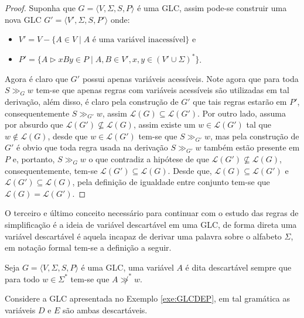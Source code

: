 \begin{proof}
    Suponha que $G = \langle V, \Sigma, S, P\rangle$ é uma GLC, assim pode-se construir uma nova GLC $G' = \langle V', \Sigma, S, P'\rangle$ onde: 
    \begin{itemize}
        \item $V' = V - \{A \in V \mid A \mbox{ é uma variável inacessível}\}$ e
        \item $P' = \{A \rhd xBy \in P \mid A, B \in V', x, y \in (V' \cup \Sigma)^*\}$.
    \end{itemize}
    Agora é claro que $G'$ possui apenas variáveis acessíveis. Note agora que para toda $S \gg_G w$ tem-se que apenas regras com variáveis acessíveis são utilizadas em tal derivação, além disso, é claro pela construção de $G'$ que tais regras estarão em $P'$, consequentemente $S \gg_{G'} w$, assim $\mathcal{L}(G) \subseteq \mathcal{L}(G')$. Por outro lado, assuma por absurdo que $\mathcal{L}(G') \not\subseteq \mathcal{L}(G)$, assim existe um $w \in \mathcal{L}(G')$ tal que $w \notin \mathcal{L}(G)$, desde que $w \in \mathcal{L}(G')$ tem-se que $S \gg_{G'} w$, mas pela construção de $G'$ é obvio que toda regra usada na derivação $S \gg_{G'} w$ também estão presente em $P$ e, portanto, $S \gg_{G} w$ o que contradiz a hipótese de que $\mathcal{L}(G') \not\subseteq \mathcal{L}(G)$, consequentemente, tem-se $\mathcal{L}(G') \subseteq \mathcal{L}(G)$. Desde que, $\mathcal{L}(G) \subseteq \mathcal{L}(G')$ e $\mathcal{L}(G') \subseteq \mathcal{L}(G)$, pela definição de igualdade entre conjunto tem-se que $\mathcal{L}(G) = \mathcal{L}(G')$.
\end{proof}

O terceiro e último conceito necessário para continuar com o estudo das regras de simplificação é a ideia de variável descartável em uma GLC, de forma direta uma variável descartável é aquela incapaz de derivar uma palavra sobre o alfabeto $\Sigma$, em notação formal tem-se a definição a seguir.

\begin{definition}\label{def:VariavelDescartavel}
    Seja $G = \langle V, \Sigma, S, P\rangle$ é uma GLC, uma variável $A$ é dita descartável sempre que para todo $w \in \Sigma^*$ tem-se que $A \not\gg^* w$.
\end{definition}

\begin{example}
    Considere a GLC apresentada no Exemplo \ref{exe:GLCDEP}, em tal gramática as variáveis $D$ e $E$ são ambas descartáveis.
\end{example}

